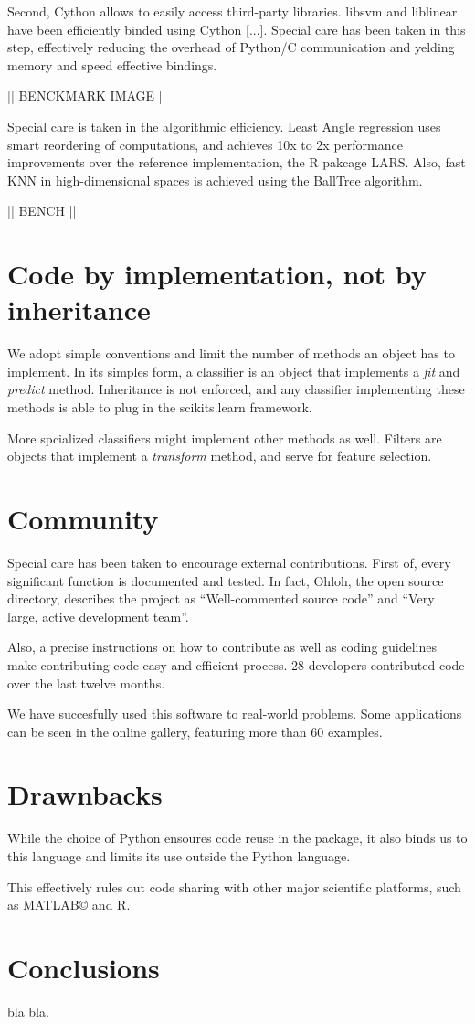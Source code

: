 \documentclass[twoside,11pt]{article}
\begin{document}
Second, Cython allows to easily access third-party libraries. libsvm
and liblinear have been efficiently binded using Cython [...]. Special
care has been taken in this step, effectively reducing the overhead of
Python/C communication and yelding memory and speed effective bindings.


|| BENCKMARK IMAGE ||


Special care is taken in the algorithmic efficiency. Least Angle
regression uses smart reordering of computations, and achieves 10x to
2x performance improvements over the reference implementation, the R
pakcage LARS. Also, fast KNN in high-dimensional spaces is achieved
using the BallTree algorithm.

|| BENCH ||


\section{Code by implementation, not by inheritance}

We adopt simple conventions and limit the number of methods an object
has to implement. In its simples form, a classifier is an object that
implements a \emph{fit} and \emph{predict} method. Inheritance is not
enforced, and any classifier implementing these methods is able to
plug in the scikits.learn framework.


More spcialized classifiers might implement other methods as
well. Filters are objects that implement a \emph{transform} method,
and serve for feature selection.



\section{Community}

Special care has been taken to encourage external contributions. First
of, every significant function is documented and tested. In fact,
Ohloh, the open source directory, describes the project as
``Well-commented source code'' and ``Very large, active development
team''.

Also, a precise instructions on how to contribute as well as coding
guidelines make contributing code easy and efficient process. 28
developers contributed code over the last twelve months.

We have succesfully used this software to real-world problems. Some
applications can be seen in the online gallery, featuring more than 60
examples.


\section{Drawnbacks}
While the choice of Python ensoures code reuse in the package, it also
binds us to this language and limits its use outside the Python
language.

This effectively rules out code sharing with other major scientific
platforms, such as MATLAB© and R.


\section{Conclusions}

bla bla.
\end{document}
